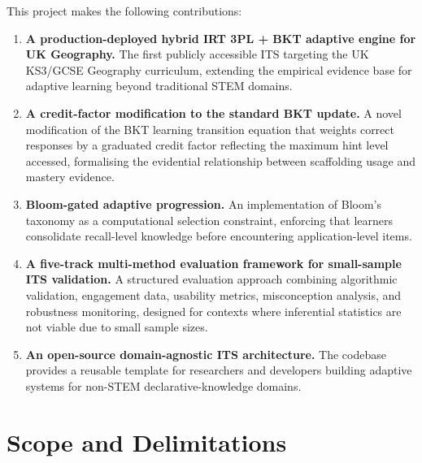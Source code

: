 This project makes the following contributions:

\begin{enumerate}[leftmargin=2em]

  \item \textbf{A production-deployed hybrid IRT 3PL + BKT adaptive engine
  for UK Geography.} The first publicly accessible ITS targeting the UK
  KS3/GCSE Geography curriculum, extending the empirical evidence base for
  adaptive learning beyond traditional STEM domains.

  \item \textbf{A credit-factor modification to the standard BKT update.}
  A novel modification of the BKT learning transition equation that weights
  correct responses by a graduated credit factor reflecting the maximum hint
  level accessed, formalising the evidential relationship between scaffolding
  usage and mastery evidence.

  \item \textbf{Bloom-gated adaptive progression.} An implementation of
  Bloom's taxonomy as a computational selection constraint, enforcing that
  learners consolidate recall-level knowledge before encountering
  application-level items.

  \item \textbf{A five-track multi-method evaluation framework for small-sample
  ITS validation.} A structured evaluation approach combining algorithmic
  validation, engagement data, usability metrics, misconception analysis, and
  robustness monitoring, designed for contexts where inferential statistics are
  not viable due to small sample sizes.

  \item \textbf{An open-source domain-agnostic ITS architecture.} The codebase
  provides a reusable template for researchers and developers building adaptive
  systems for non-STEM declarative-knowledge domains.

\end{enumerate}

\section{Scope and Delimitations}
\label{sec:intro_scope}

